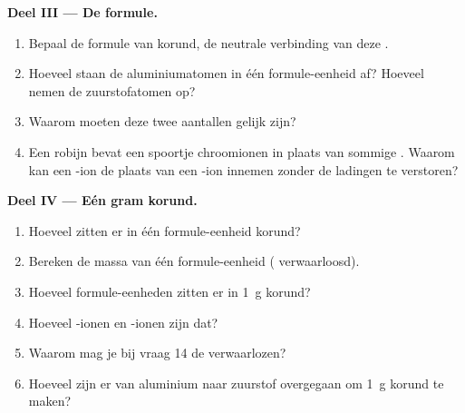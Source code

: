 \begin{problem}
\medskip
\noindent\textbf{Deel III --- De formule.}
\begin{enumerate}[resume]
  \item Bepaal de formule van korund, de neutrale verbinding van deze
        .
  \item Hoeveel  staan de aluminiumatomen in één formule-eenheid
        af? Hoeveel nemen de zuurstofatomen op?
  \item Waarom moeten deze twee aantallen gelijk zijn?
  \item Een robijn bevat een spoortje chroomionen  in plaats
        van sommige . Waarom kan een -ion de plaats
        van een -ion innemen zonder de ladingen te verstoren?
\end{enumerate}

\medskip
\noindent\textbf{Deel IV --- Eén gram korund.}
\begin{enumerate}[resume]
  \item Hoeveel  zitten er in één formule-eenheid korund?
  \item Bereken de massa van één formule-eenheid ( verwaarloosd).
  \item Hoeveel formule-eenheden zitten er in \qty{1}{g} korund?
  \item Hoeveel -ionen en -ionen zijn dat?
  \item Waarom mag je bij vraag 14 de  verwaarlozen?
  \item Hoeveel  zijn er van aluminium naar zuurstof
        overgegaan om \qty{1}{g} korund te maken?
\end{enumerate}
\end{problem}

